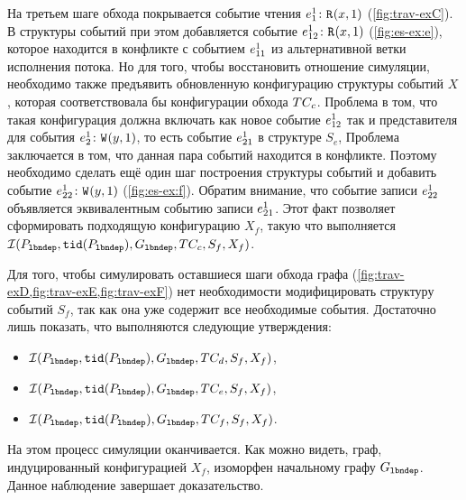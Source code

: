 На третьем шаге обхода покрывается событие чтения
$e^{1}_{1}\colon {{\mathtt{R}}}^{}({x},{1})$ (\cref{fig:trav-exC}).
В структуры событий при этом добавляется событие
$e^{1}_{12}\colon {{\mathtt{R}}}^{}({x},{1})$ (\cref{fig:es-ex:e}),
которое находится в конфликте с событием $e^{1}_{11}$
из альтернативной ветки исполнения потока.
Но для того, чтобы восстановить отношение симуляции,
необходимо также предъявить обновленную конфигурацию
структуры событий $X$, которая соответствовала бы
конфигурации обхода $TC_c$.
Проблема в том, что такая конфигурация должна включать
как новое событие $e^{1}_{12}$ так и
представителя для события $e^{1}_{2}\colon {{\mathtt{W}}}^{}({y},{1})$,
то есть событие $e^{1}_{21}$ в структуре $S_e$,
Проблема заключается в том, что данная пара событий
находится в конфликте. 
Поэтому необходимо сделать ещё один шаг построения
структуры событий и добавить событие $e^{1}_{22}\colon {{\mathtt{W}}}^{}({y},{1})$
(\cref{fig:es-ex:f}).
Обратим внимание, что событие записи $e^{1}_{22}$ объявляется
эквивалентным событию записи $e^{1}_{21}$.
Этот факт позволяет сформировать подходящую
конфигурацию $X_f$, такую что выполняется
$\mathcal{I}(P_{\mathtt{lbndep}}, {\mathtt{tid}}(P_{\mathtt{lbndep}}), G_{\mathtt{lbndep}}, TC_c, S_f, X_f)$.

Для того, чтобы симулировать оставшиеся шаги обхода графа
(\cref{fig:trav-exD,fig:trav-exE,fig:trav-exF})
нет необходимости модифицировать структуру событий $S_f$,
так как она уже содержит все необходимые события. 
Достаточно лишь показать, что выполняются следующие утверждения:
\begin{itemize}
  \item $\mathcal{I}(P_{\mathtt{lbndep}}, {\mathtt{tid}}(P_{\mathtt{lbndep}}), G_{\mathtt{lbndep}}, TC_d, S_f, X_f)$,
  \item $\mathcal{I}(P_{\mathtt{lbndep}}, {\mathtt{tid}}(P_{\mathtt{lbndep}}), G_{\mathtt{lbndep}}, TC_e, S_f, X_f)$,
  \item $\mathcal{I}(P_{\mathtt{lbndep}}, {\mathtt{tid}}(P_{\mathtt{lbndep}}), G_{\mathtt{lbndep}}, TC_f, S_f, X_f)$.
\end{itemize}
На этом процесс симуляции оканчивается.
Как можно видеть, граф, индуцированный конфигурацией $X_f$,
изоморфен начальному графу $G_{\mathtt{lbndep}}$.
Данное наблюдение завершает доказательство.
